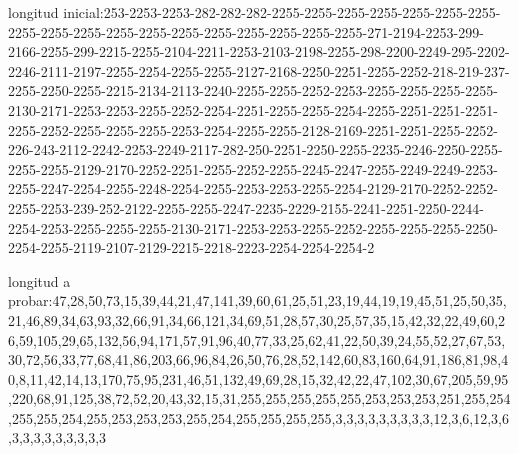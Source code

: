 \documentclass{article}
\begin{document}
longitud inicial:253-2253-2253-282-282-282-2255-2255-2255-2255-2255-2255-2255-2255-2255-2255-2255-2255-2255-2255-2255-2255-2255-2255-271-2194-2253-299-2166-2255-299-2215-2255-2104-2211-2253-2103-2198-2255-298-2200-2249-295-2202-2246-2111-2197-2255-2254-2255-2255-2127-2168-2250-2251-2255-2252-218-219-237-2255-2250-2255-2215-2134-2113-2240-2255-2255-2252-2253-2255-2255-2255-2255-2130-2171-2253-2253-2255-2252-2254-2251-2255-2255-2254-2255-2251-2251-2251-2255-2252-2255-2255-2255-2253-2254-2255-2255-2128-2169-2251-2251-2255-2252-226-243-2112-2242-2253-2249-2117-282-250-2251-2250-2255-2235-2246-2250-2255-2255-2255-2129-2170-2252-2251-2255-2252-2255-2245-2247-2255-2249-2249-2253-2255-2247-2254-2255-2248-2254-2255-2253-2253-2255-2254-2129-2170-2252-2252-2255-2253-239-252-2122-2255-2255-2247-2235-2229-2155-2241-2251-2250-2244-2254-2253-2255-2255-2255-2130-2171-2253-2253-2255-2252-2255-2255-2255-2250-2254-2255-2119-2107-2129-2215-2218-2223-2254-2254-2254-2

longitud a probar:47,28,50,73,15,39,44,21,47,141,39,60,61,25,51,23,19,44,19,19,45,51,25,50,35,21,46,89,34,63,93,32,66,91,34,66,121,34,69,51,28,57,30,25,57,35,15,42,32,22,49,60,26,59,105,29,65,132,56,94,171,57,91,96,40,77,33,25,62,41,22,50,39,24,55,52,27,67,53,30,72,56,33,77,68,41,86,203,66,96,84,26,50,76,28,52,142,60,83,160,64,91,186,81,98,40,8,11,42,14,13,170,75,95,231,46,51,132,49,69,28,15,32,42,22,47,102,30,67,205,59,95,220,68,91,125,38,72,52,20,43,32,15,31,255,255,255,255,255,253,253,253,251,255,254,255,255,254,255,253,253,253,255,254,255,255,255,255,3,3,3,3,3,3,3,3,3,12,3,6,12,3,6,3,3,3,3,3,3,3,3,3
\end{document}
